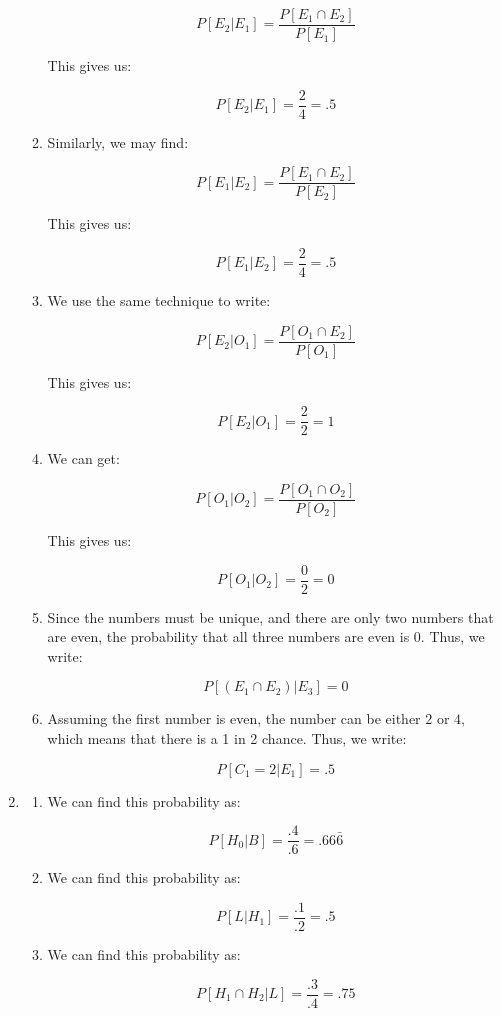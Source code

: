 \begin{enumerate}
\begin{enumerate}
        $$P[E_2|E_1]=\frac{P[E_1\cap E_2]}{P[E_1]}$$

        This gives us:
        
        $$\boxed{P[E_2|E_1]=\frac{2}{4}=.5}$$

      \item Similarly, we may find:

        $$P[E_1|E_2]=\frac{P[E_1\cap E_2]}{P[E_2]}$$

        This gives us:

        $$\boxed{P[E_1|E_2]=\frac{2}{4}=.5}$$

      \item We use the same technique to write:

        $$P[E_2|O_1]=\frac{P[O_1\cap E_2]}{P[O_1]}$$

        This gives us:

        $$\boxed{P[E_2|O_1]=\frac{2}{2}=1}$$

      \item We can get:

        $$P[O_1|O_2]=\frac{P[O_1\cap O_2]}{P[O_2]}$$

        This gives us:

        $$\boxed{P[O_1|O_2]=\frac{0}{2}=0}$$

      \item Since the numbers must be unique, and there are only two numbers that are even, the probability that all three numbers are even is 0. Thus, we write:

        $$\boxed{P[(E_1\cap E_2)|E_3]=0}$$

      \item Assuming the first number is even, the number can be either $2$ or $4$, which means that there is a 1 in 2 chance. Thus, we write:

        $$\boxed{P[C_1=2|E_1]=.5}$$

    \end{enumerate}

  \item 

    \begin{enumerate}

      \item We can find this probability as:

        $$\boxed{P[H_0|B]=\frac{.4}{.6}=.66\bar{6}}$$

      \item We can find this probability as:

        $$\boxed{P[L|H_1]=\frac{.1}{.2}=.5}$$

      \item We can find this probability as:

        $$\boxed{P[H_1\cap H_2|L]=\frac{.3}{.4}=.75}$$

    \end{enumerate}

\end{enumerate}



